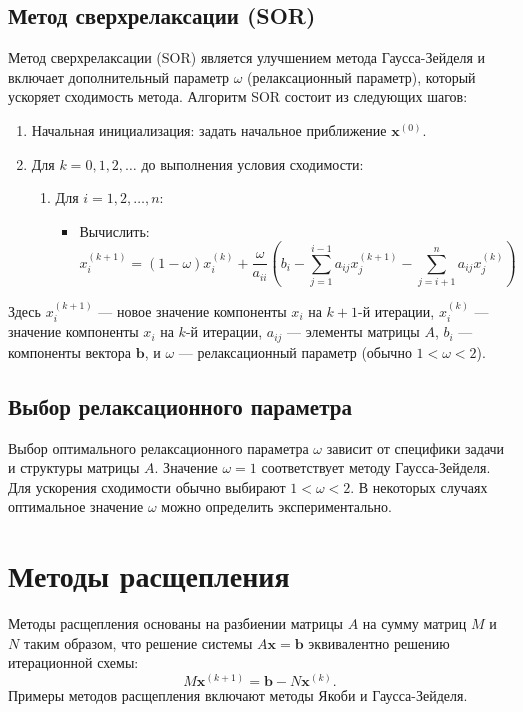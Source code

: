 \documentclass{article}
\begin{document}
\subsection*{Метод сверхрелаксации (SOR)}

Метод сверхрелаксации (SOR) является улучшением метода Гаусса-Зейделя и включает дополнительный параметр \(\omega\) (релаксационный параметр), который ускоряет сходимость метода. Алгоритм SOR состоит из следующих шагов:

\begin{enumerate}
    \item Начальная инициализация: задать начальное приближение \(\mathbf{x}^{(0)}\).
    \item Для \(k = 0, 1, 2, \ldots\) до выполнения условия сходимости:
    \begin{enumerate}
        \item Для \(i = 1, 2, \ldots, n\):
        \begin{itemize}
            \item Вычислить:
            \[
            x_i^{(k+1)} = (1 - \omega) x_i^{(k)} + \frac{\omega}{a_{ii}} \left( b_i - \sum_{j=1}^{i-1} a_{ij} x_j^{(k+1)} - \sum_{j=i+1}^{n} a_{ij} x_j^{(k)} \right)
            \]
        \end{itemize}
    \end{enumerate}
\end{enumerate}

Здесь \(x_i^{(k+1)}\) — новое значение компоненты \(x_i\) на \(k+1\)-й итерации, \(x_i^{(k)}\) — значение компоненты \(x_i\) на \(k\)-й итерации, \(a_{ij}\) — элементы матрицы \(A\), \(b_i\) — компоненты вектора \(\mathbf{b}\), и \(\omega\) — релаксационный параметр (обычно \(1 < \omega < 2\)).

\subsection*{Выбор релаксационного параметра}

Выбор оптимального релаксационного параметра \(\omega\) зависит от специфики задачи и структуры матрицы \(A\). Значение \(\omega = 1\) соответствует методу Гаусса-Зейделя. Для ускорения сходимости обычно выбирают \(1 < \omega < 2\). В некоторых случаях оптимальное значение \(\omega\) можно определить экспериментально.

\section{Методы расщепления}
Методы расщепления основаны на разбиении матрицы $A$ на сумму матриц $M$ и $N$ таким образом, что решение системы $A\mathbf{x} = \mathbf{b}$ эквивалентно решению итерационной схемы:
\[
M \mathbf{x}^{(k+1)} = \mathbf{b} - N \mathbf{x}^{(k)}.
\]
Примеры методов расщепления включают методы Якоби и Гаусса-Зейделя.
\end{document}
